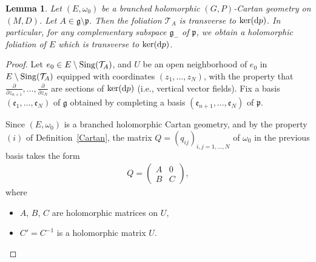 \documentclass[10pt,a4paper]{amsart}
\newcommand{\der}[2]{\frac{\partial #1}{\partial#2}}
\numberwithin{equation}{section}
\newtheorem{Lemma}[Theorem]{Lemma}
\begin{document}
\begin{Lemma}\label{branchedfoliation} Let $(E,\omega_0)$ be a branched holomorphic $(G,P)$-Cartan geometry on $(M,D)$. Let $A\in \mathfrak{g}\setminus \mathfrak{p}$. Then the foliation $\mathcal{T}_A$ is transverse to $\ker({\rm d}p)$. In particular, for any complementary subspace $\mathfrak{g}_-$ of $\mathfrak{p}$, we obtain a holomorphic foliation of $E$ which is transverse to $\ker({\rm d}p)$. \end{Lemma}
\begin{proof}
Let $e_0\in E\setminus {\rm Sing}(\mathcal{T}_A)$, and $U$ be an open neighborhood of $e_0$ in $E\setminus {\rm Sing}(\mathcal{T}_A)$ equipped with coordinates $(z_1,\dots,z_N)$, with the property that $\der{}{z_{n+1}},\dots,\der{}{z_{N}}$ are sections of $\ker({\rm d}p)$ (i.e., vertical vector fields). Fix a basis $(\mathfrak{e}_1,\dots,\mathfrak{e}_N)$ of $\mathfrak{g}$ obtained by completing a basis $(\mathfrak{e}_{n+1},\dots,\mathfrak{e}_N)$ of $\mathfrak{p}$.


Since $(E,\omega_0)$ is a branched holomorphic Cartan geometry, and by the property $(i)$ of Definition~\ref{Cartan}, the matrix $Q=(q_{ij})_{i,j=1,\dots,N}$ of $\omega_0$ in the previous basis takes the form %
 \begin{align*} Q = \begin{pmatrix}
 A & 0 \\ B & C \end{pmatrix}, \end{align*}
 where
  \begin{itemize}\itemsep=0pt
\item $A$, $B$, $C$ are holomorphic matrices on $U$,
\item $C'=C^{-1}$ is a holomorphic matrix $U$.
\end{itemize}


\end{proof}
\end{document}
